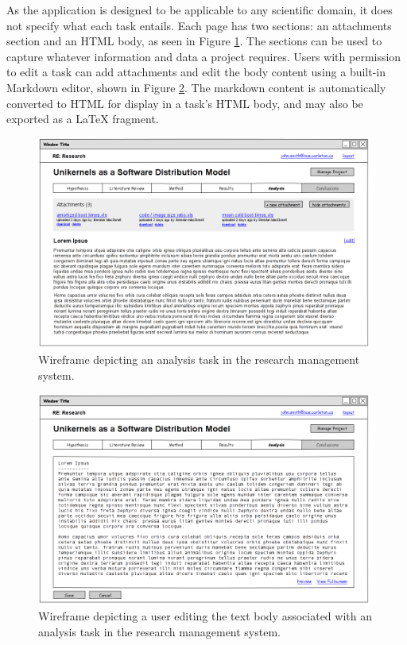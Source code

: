 \documentclass[document.tex]{subfiles}
\begin{document}
As the application is designed to be applicable to any scientific domain, it does not specify what each task entails.
Each page has two sections: an attachments section and an HTML body, as seen in Figure \ref{fig:case-research-design-view-analysis}.
The sections can be used to capture whatever information and data a project requires.
Users with permission to edit a task can add attachments and edit the body content using a built-in Markdown editor, shown in Figure \ref{fig:case-research-design-edit-analysis}.
The markdown content is automatically converted to HTML for display in a task's HTML body, and may also be exported as a LaTeX fragment.

\begin{figure}[!ht]
\centering \includegraphics[width=5.5in]{./img/case-study-research-railgun/mockup-view-analysis}
\caption{Wireframe depicting an analysis task in the research management system.}
\label{fig:case-research-design-view-analysis}
\end{figure}

\begin{figure}[!ht]
\centering \includegraphics[width=5.5in]{./img/case-study-research-railgun/mockup-edit-analysis}
\caption{Wireframe depicting a user editing the text body associated with an analysis task in the research management system.}
\label{fig:case-research-design-edit-analysis}
\end{figure}
\end{document}
